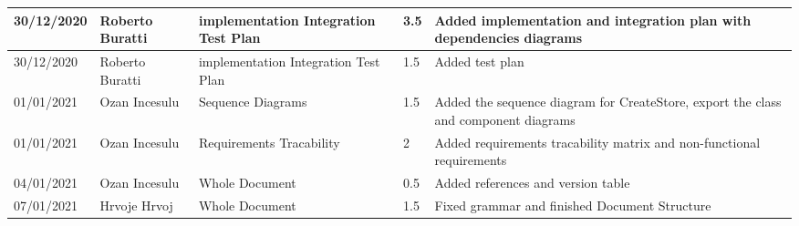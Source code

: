 \begin{table}[h]
\begin{tabular}{|p{2cm}|p{2cm}|p{2cm}|p{1.5cm}|p{8cm}|}
        30/12/2020 & Roberto Buratti & implementation Integration Test Plan & 3.5                 & Added implementation and integration plan with dependencies diagrams\\ \hline
        30/12/2020 & Roberto Buratti & implementation Integration Test Plan & 1.5                 & Added test plan\\ \hline
        01/01/2021 & Ozan Incesulu & Sequence Diagrams & 1.5              & Added the sequence diagram for CreateStore, export the class and component diagrams \\ \hline
        01/01/2021 & Ozan Incesulu & Requirements Tracability & 2 & Added requirements tracability matrix and non-functional requirements \\ \hline
        04/01/2021 & Ozan Incesulu & Whole Document & 0.5 & Added references and version table \\ \hline
        07/01/2021 & Hrvoje Hrvoj  & Whole Document & 1.5 & Fixed grammar and finished Document Structure \\ \hline
    \end{tabular}
\end{table}
